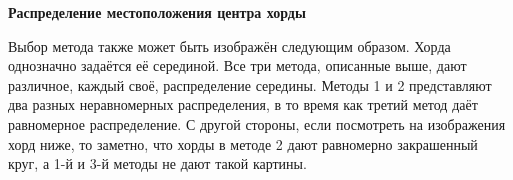 \begin{exmp}
	\textbf{Распределение местоположения центра хорды}
	
	Выбор метода также может быть изображён следующим образом. Хорда однозначно задаётся её серединой. Все три метода, описанные выше, дают различное, каждый своё, распределение середины. Методы 1 и 2 представляют два разных неравномерных распределения, в то время как третий метод даёт равномерное распределение. С другой стороны, если посмотреть на изображения хорд ниже, то заметно, что хорды в методе 2 дают равномерно закрашенный круг, а 1-й и 3-й методы не дают такой картины.
	\begin{figure}[H]
		\centering
		\hfill
		\hfill
	\end{figure}
	\begin{figure}[H]
		\centering

\end{figure}
\end{exmp}
